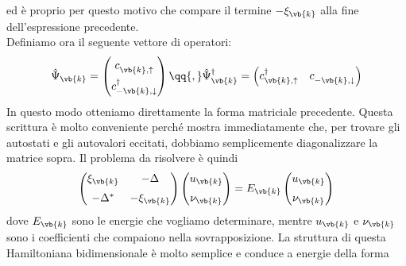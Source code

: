 ed è proprio per questo motivo che compare il termine $-\xi_{\vb{k}}$ alla fine dell'espressione precedente.\\
Definiamo ora il seguente vettore di operatori:
\begin{equation*}
   \hat{\Psi}_{\vb{k}}
   =
   \begin{pmatrix}
      c^{\vphantom{\dag}}_{\vb{k},\uparrow}\\[0.2cm]
      c^{\dag}_{-\vb{k},\downarrow}
   \end{pmatrix}
   \qq{,}
   \hat{\Psi}^{\dag}_{\vb{k}}
   =
   \begin{pmatrix}
      c^{\dag}_{\vb{k},\uparrow}
      &
      c^{\vphantom{\dag}}_{-\vb{k},\downarrow}
   \end{pmatrix}
\end{equation*}
In questo modo otteniamo direttamente la forma matriciale precedente. Questa scrittura è molto conveniente perché mostra immediatamente che, per trovare gli autostati e gli autovalori eccitati, dobbiamo semplicemente diagonalizzare la matrice sopra. Il problema da risolvere è quindi
\begin{equation*}
   \begin{pmatrix}
      \xi_{\vb{k}} & -\Delta\\[0.2cm]
      -\Delta^* & -\xi_{\vb{k}}
   \end{pmatrix}
   \begin{pmatrix}
      u_{\vb{k}}\\[0.2cm]
      \nu_{\vb{k}}
   \end{pmatrix}
   =
   E_{\vb{k}}
   \begin{pmatrix}
      u_{\vb{k}}\\[0.2cm]
      \nu_{\vb{k}}
   \end{pmatrix}
\end{equation*}
dove $E_{\vb{k}}$ sono le energie che vogliamo determinare, mentre $u_{\vb{k}}$ e $\nu_{\vb{k}}$ sono i coefficienti che compaiono nella sovrapposizione. La struttura di questa Hamiltoniana bidimensionale è molto semplice e conduce a energie della forma
